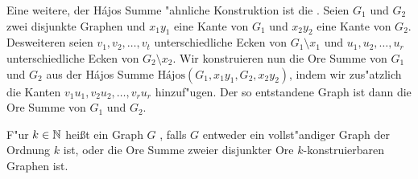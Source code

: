 Eine weitere, der H\'ajos Summe "ahnliche Konstruktion ist die  \cite{Ore67}. Seien $G_1$ und $G_2$ zwei disjunkte Graphen und $x_1y_1$ eine Kante von $G_1$ und $x_2y_2$ eine Kante von $G_2$. Desweiteren seien $v_1,v_2,\dots,v_t$ unterschiedliche Ecken von $G_1\setminus x_1$ und $u_1,u_2,\dots,u_r$ unterschiedliche Ecken von $G_2\setminus x_2$. Wir konstruieren nun die Ore Summe von $G_1$ und $G_2$ aus der H\'ajos Summe
$\text{H\'ajos}(G_1,x_1y_1, G_2, x_2y_2)$, indem wir zus"atzlich die Kanten $v_1u_1,v_2u_2,\dots,v_ru_r$ hinzuf"ugen. Der so entstandene Graph ist dann die Ore Summe von $G_1$ und $G_2$. 

F"ur $k\in{\mathbb{N}}$ hei{\ss}t ein Graph $G$ , falls $G$ entweder ein vollst"andiger Graph der Ordnung $k$ ist, oder die Ore Summe zweier disjunkter Ore $k$-konstruierbaren Graphen ist. 
